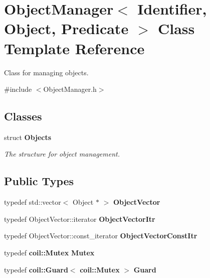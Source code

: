 \section{ObjectManager$<$ Identifier, Object, Predicate $>$ Class Template Reference}
\label{classObjectManager}


Class for managing objects.  




{\ttfamily \#include $<$ObjectManager.h$>$}

\subsection*{Classes}
\begin{DoxyCompactItemize}
\item 
struct {\bf Objects}
\begin{DoxyCompactList}\small\item\em The structure for object management. \item\end{DoxyCompactList}\end{DoxyCompactItemize}
\subsection*{Public Types}
\begin{DoxyCompactItemize}
\item 
typedef std::vector$<$ Object $\ast$ $>$ {\bf ObjectVector}
\item 
typedef ObjectVector::iterator {\bf ObjectVectorItr}
\item 
typedef ObjectVector::const\_\-iterator {\bf ObjectVectorConstItr}
\item 
typedef {\bf coil::Mutex} {\bf Mutex}
\item 
typedef {\bf coil::Guard}$<$ {\bf coil::Mutex} $>$ {\bf Guard}
\end{DoxyCompactItemize}
